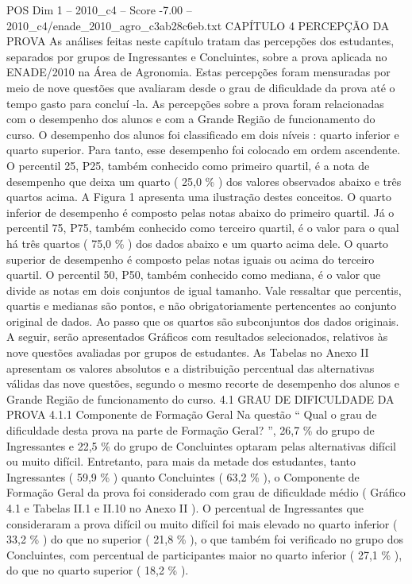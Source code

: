 \begin{textsample}{POS Dim 1 – 2010\_c4 – Score -7.00 – 2010\_c4/enade\_2010\_agro\_c3ab28c6eb.txt}  \label{ex:f1_pos_408}
CAPÍTULO 4 PERCEPÇÃO DA PROVA As análises feitas neste capítulo tratam das percepções dos estudantes, separados por grupos de Ingressantes e Concluintes, sobre a prova aplicada no ENADE/2010 na Área de Agronomia.
Estas percepções foram mensuradas por meio de nove questões que avaliaram desde o grau de dificuldade da prova até o tempo gasto para concluí -la.
As percepções sobre a prova foram relacionadas com o desempenho dos alunos e com a Grande Região de funcionamento do curso.
O desempenho dos alunos foi classificado em dois níveis : quarto inferior e quarto superior.
Para tanto, esse desempenho foi colocado em ordem ascendente.
O percentil 25, P25, também conhecido como primeiro quartil, é a nota de desempenho que deixa um quarto ( 25,0 \% ) dos valores observados abaixo e três quartos acima.
A Figura 1 apresenta uma ilustração destes conceitos.
O quarto inferior de desempenho é composto pelas notas abaixo do primeiro quartil.
Já o percentil 75, P75, também conhecido como terceiro quartil, é o valor para o qual há três quartos ( 75,0 \% ) dos dados abaixo e um quarto acima dele.
O quarto superior de desempenho é composto pelas notas iguais ou acima do terceiro quartil.
O percentil 50, P50, também conhecido como mediana, é o valor que divide as notas em dois conjuntos de igual tamanho.
Vale ressaltar que percentis, quartis e medianas são pontos, e não obrigatoriamente pertencentes ao conjunto original de dados.
Ao passo que os quartos são subconjuntos dos dados originais.
A seguir, serão apresentados Gráficos com resultados selecionados, relativos às nove questões avaliadas por grupos de estudantes.
As Tabelas no Anexo II apresentam os valores absolutos e a distribuição percentual das alternativas válidas das nove questões, segundo o mesmo recorte de desempenho dos alunos e Grande Região de funcionamento do curso. 4.1 GRAU DE DIFICULDADE DA PROVA 4.1.1 Componente de Formação Geral Na questão “ Qual o grau de dificuldade desta prova na parte de Formação Geral? ”, 26,7 \% do grupo de Ingressantes e 22,5 \% do grupo de Concluintes optaram pelas alternativas difícil ou muito difícil.
Entretanto, para mais da metade dos estudantes, tanto Ingressantes ( 59,9 \% ) quanto Concluintes ( 63,2 \% ), o Componente de Formação Geral da prova foi considerado com grau de dificuldade médio ( Gráfico 4.1 e Tabelas II.1 e II.10 no Anexo II ).
O percentual de Ingressantes que consideraram a prova difícil ou muito difícil foi mais elevado no quarto inferior ( 33,2 \% ) do que no superior ( 21,8 \% ), o que também foi verificado no grupo dos Concluintes, com percentual de participantes maior no quarto inferior ( 27,1 \% ), do que no quarto superior ( 18,2 \% ).

\end{textsample}
